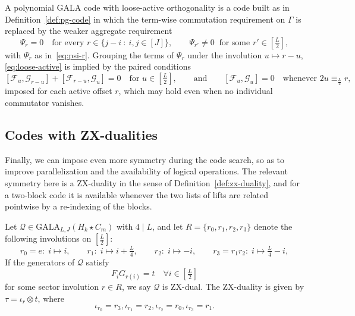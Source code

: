 \begin{definition}\label{def:loose-orthogonality}
A polynomial GALA code with loose-active orthogonality is a code built as in Definition~\ref{def:pg-code} in which the term-wise commutation requirement on $\Gamma$ is replaced by the weaker aggregate requirement
\begin{equation}\label{eq:loose-active}
    \Psi_r = 0\quad\text{for every } r\in\{j-i\ :\ i,j\in[J]\},\qquad \Psi_{r'}\neq 0\ \text{ for some } r'\in[\tfrac L2],
\end{equation}
with $\Psi_r$ as in~\eqref{eq:psi-r}. Grouping the terms of $\Psi_r$ under the involution $u\mapsto r-u$, \eqref{eq:loose-active} is implied by the paired conditions
\[
    [\mathcal F_u,\mathcal G_{r-u}] + [\mathcal F_{r-u},\mathcal G_u] = 0\quad\text{for } u\in[\tfrac L2],
    \qquad\text{and}\qquad
    [\mathcal F_u,\mathcal G_u] = 0 \quad\text{whenever } 2u\equiv_{\frac L2} r,
\]
imposed for each active offset $r$, which may hold even when no individual commutator vanishes.
\end{definition}


\subsection{Codes with ZX-dualities}\label{ssec:zxdual}
Finally, we can impose even more symmetry during the code search, so as to improve parallelization and the availability of logical operations. The relevant symmetry here is a ZX-duality in the sense of Definition~\ref{def:zx-duality}, and for a two-block code it is available whenever the two lists of lifts are related pointwise by a re-indexing of the blocks.

\begin{proposition}\label{def:dual-gala}
Let $\mathcal{Q}\in \mathrm{GALA}_{L,J}(H_k\star C_m)$ with $4\mid L$, and let $R = \{r_0,r_1, r_2, r_3 \}$ denote the following involutions on $[\frac{L}{2}]$:
\begin{equation}\label{eq:zx-sector-maps}
    r_0 = e:\; i\mapsto i,\qquad r_1:\; i\mapsto i + \tfrac L4,\qquad r_2:\; i\mapsto -i,\qquad r_3=r_1r_2:\; i\mapsto \tfrac L4 - i ,
\end{equation}
If the generators of $\mathcal Q$ satisfy
\begin{equation}\label{eq:zx-generator-condition}
    F_iG_{r(i)} = t \quad \forall i\in [\tfrac L2]
\end{equation}
for some {sector involution} $r\in R$, we say $\mathcal Q$ is ZX-dual. The ZX-duality is given by $\tau = \iota_r\otimes t$, where
\begin{equation}\label{eq:zx-iota}
\iota_{r_0} = r_3, \iota_{r_1} = r_2, \iota_{r_2} = r_0, \iota_{r_3} = r_1.
\end{equation}
\end{proposition}

